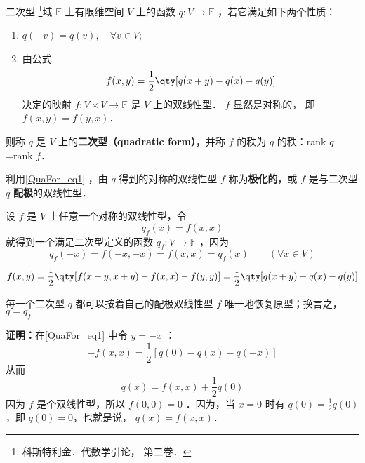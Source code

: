 
\begin{definition}{二次型}
\footnote{科斯特利金．代数学引论， 第二卷．}域 $\mathbb{F}$ 上有限维空间 $V$ 上的函数 $q:V\rightarrow\mathbb{F}$ ，若它满足如下两个性质：
\begin{enumerate}
\item $q(-{v})=q( v),\quad \forall v\in V$;
\item 由公式
\begin{equation}\label{QuaFor_eq1}
f(x, y)=\frac{1}{2}\qty[q(x+ y)-q(x)-q(y)]
\end{equation}
决定的映射 $f:V\times V\rightarrow\mathbb{F}$ 是 $V$ 上的双线性型． $f$ 显然是对称的， 即 $f(x,y) = f(y,x)$．
\end{enumerate}
则称 $q$ 是 $V$ 上的\textbf{二次型（quadratic form）}，并称 $f$ 的秩为 $q$ 的秩：rank $q$=rank $f$．
\end{definition}
利用\autoref{QuaFor_eq1} ，由 $q$ 得到的对称的双线性型 $f$ 称为\textbf{极化的}，或 $f$ 是与二次型 $q$ \textbf{配极}的双线性型．
\begin{example}{}
设 $f$ 是 $V$ 上任意一个对称的双线性型，令
\begin{equation}
q_f( x)=f( x, x)
\end{equation}
就得到一个满足二次型定义的函数 $q_f:V\rightarrow\mathbb{F}$ ，因为
\begin{equation}
q_f(-{x})=f(-{x},-{x})=f({x},{x})=q_f({x}) \qquad (\forall x\in V)
\end{equation}
\begin{equation}
f(x, y)=\frac{1}{2}\qty[f( x+ y, x+ y)-f( x, x)-f( y, y)]
=\frac{1}{2}\qty[q(x+ y)-q(x)-q(y)]
\end{equation}
\end{example}
\begin{theorem}{}\label{QuaFor_the1}
每一个二次型 $q$ 都可以按着自己的配极双线性型 $f$ 唯一地恢复原型；换言之， $q=q_f$
\end{theorem}
\textbf{证明：}在\autoref{QuaFor_eq1} 中令 $y=-x$ ：
\begin{equation}
-f(x,x)=\frac{1}{2}[q(0)-q(x)-q(-x)]
\end{equation}
从而
\begin{equation}
q(x)=f(x,x)+\frac{1}{2}q(0)
\end{equation}
因为 $f$ 是个双线性型，所以 $f(0,0)=0$ ．因为，当 $x=0$ 时有 $q(0)=\frac{1}{2}q(0)$ ，即 $q(0)=0$，也就是说， $q(x)=f(x,x)$．

